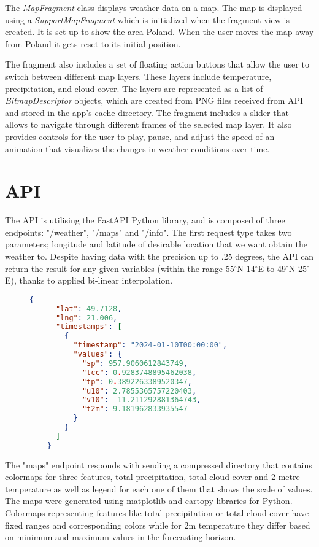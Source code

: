  The \textit{MapFragment} class displays weather data on a map. The map is displayed using a \textit{SupportMapFragment} which is initialized when the fragment view is created. It is set up to show the area Poland. When the user moves the map away from Poland it gets reset to its initial position.



The fragment also includes a set of floating action buttons that allow the user to switch between different map layers. These layers include temperature, precipitation, and cloud cover. The layers are represented as a list of \textit{BitmapDescriptor} objects, which are created from PNG files received from API and stored in the app's cache directory. The fragment includes a slider that allows to navigate through different frames of the selected map layer. It also provides controls for the user to play, pause, and adjust the speed of an animation that visualizes the changes in weather conditions over time.

\section{API}

The API is utilising the FastAPI \cite{fastapi} Python library, and is composed of three endpoints: "/weather", "/maps" and "/info". The first request type takes two parameters; longitude and latitude of desirable location that we want obtain the weather to. Despite having data with the precision up to .25 degrees, the API can return the result for any given variables (within the range 55$^{\circ}$N 14$^{\circ}$E to 49$^{\circ}$N 25$^{\circ}$E), thanks to applied bi-linear interpolation. 

\begin{figure}
    \begin{lstlisting}[language=json]
    {
      "lat": 49.7128,
      "lng": 21.006,
      "timestamps": [
        {
          "timestamp": "2024-01-10T00:00:00",
          "values": {
            "sp": 957.9060612843749,
            "tcc": 0.9283748895462038,
            "tp": 0.3892263389520347,
            "u10": 2.7855365757220403,
            "v10": -11.211292881364743,
            "t2m": 9.181962833935547
          }
        }
      ]
    }
    \end{lstlisting}
\end{figure}

The "maps" endpoint responds with sending a compressed directory that contains colormaps for three features, total precipitation, total cloud cover and 2 metre temperature as well as legend for each one of them that shows the scale of values. The maps were generated using matplotlib \cite{Hunter:2007} and cartopy \cite{Cartopy} libraries for Python. Colormaps representing features like total precipitation or total cloud cover have fixed ranges and corresponding colors while for 2m temperature they differ based on minimum and maximum values in the forecasting horizon.

